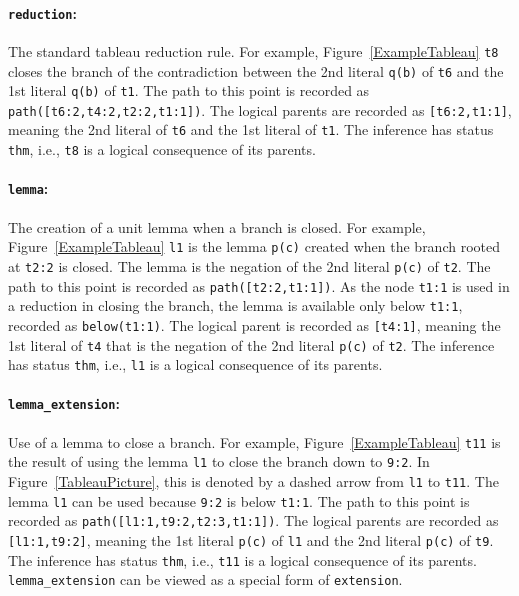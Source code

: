 \documentclass[runningheads]{llncs}
\newcommand{\smalltt}[1]{\small \texttt{#1}}
\newcommand{\mytilde}{\raisebox{0.4ex}{\texttildelow}}
\begin{document}
{\paragraph{{\tt reduction}:} The standard tableau reduction rule.
For example, Figure~\ref{ExampleTableau} {\smalltt{t8}} closes the branch of the contradiction 
between the 2nd literal {\smalltt{{\mytilde}q(b)}} of {\smalltt{t6}} and the 1st literal 
{\smalltt{q(b)}} of {\smalltt{t1}}.
The path to this point is recorded as {\smalltt{path([t6:2,t4:2,t2:2,t1:1])}}.
The logical parents are recorded as {\smalltt{[t6:2,t1:1]}}, meaning the 2nd literal of 
{\smalltt{t6}} and the 1st literal of {\smalltt{t1}}. 
The inference has status {\smalltt{thm}}, i.e., {\smalltt{t8}} is a logical consequence of its 
parents.

\paragraph{{\tt lemma}:} The creation of a unit lemma when a branch is closed.
For example, Figure~\ref{ExampleTableau} {\smalltt{l1}} is the lemma {\smalltt{p(c)}} created 
when the branch rooted at {\smalltt{t2:2}} is closed.
The lemma is the negation of the 2nd literal {\smalltt{{\mytilde}p(c)}} of {\smalltt{t2}}.
The path to this point is recorded as {\smalltt{path([t2:2,t1:1])}}.
As the node {\smalltt{t1:1}} is used in a reduction in closing the branch, the lemma is
available only below {\smalltt{t1:1}}, recorded as {\smalltt{below(t1:1)}}.
The logical parent is recorded as {\smalltt{[t4:1]}}, meaning the 1st literal of
{\smalltt{t4}} that is the negation of the 2nd literal {\smalltt{{\mytilde}p(c)}} of {\smalltt{t2}}.
The inference has status {\smalltt{thm}}, i.e., {\smalltt{l1}} is a logical consequence of its 
parents.

\paragraph{{\tt lemma\_extension}:} Use of a lemma to close a branch.
For example, Figure~\ref{ExampleTableau} {\smalltt{t11}} is the result of using the lemma 
{\smalltt{l1}} to close the branch down to {\smalltt{9:2}}. 
In Figure~\ref{TableauPicture}, this is denoted by a dashed arrow from {\smalltt{l1}} to 
{\smalltt{t11}}.
The lemma {\smalltt{l1}} can be used because {\smalltt{9:2}} is below {\smalltt{t1:1}}.
The path to this point is recorded as {\smalltt{path([l1:1,t9:2,t2:3,t1:1])}}.
The logical parents are recorded as {\smalltt{[l1:1,t9:2]}}, meaning the 1st literal 
{\smalltt{p(c)}} of {\smalltt{l1}} and the 2nd literal {\smalltt{{\mytilde}p(c)}} of 
{\smalltt{t9}}.
The inference has status {\smalltt{thm}}, i.e., {\smalltt{t11}} is a logical consequence of its
parents.
{\tt lemma\_extension} can be viewed as a special form of {\tt extension}.

}
\end{document}
